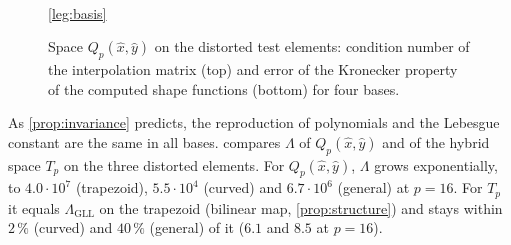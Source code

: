 \begin{figure}[t]
\\[1mm]
  \ref{leg:basis}
  \caption{Space $Q_p(\hat x,\hat y)$ on the distorted test elements: condition number of the
    interpolation matrix (top) and error of the Kronecker property of the computed shape
    functions (bottom) for four bases.}
  \label{fig:basis}
\end{figure}

\begin{table}[t]
  \centering\small
  \caption{Parallelogram (affine element), $Q_p(\hat x,\hat y)$: asymmetry
    $\|\bm K^e-\bm K^{e\T}\|_F/\|\bm K^e\|_F$ of the element matrix (zero in exact arithmetic) and
    condition number of $\bm V$.}
  \label{tab:affine}
  
\end{table}

As \cref{prop:invariance} predicts, the reproduction of polynomials and the Lebesgue constant
are the same in all bases.  compares $\Lambda$ of $Q_p(\hat x,\hat y)$ and of
the hybrid space $T_p$ on the three distorted elements. For $Q_p(\hat x,\hat y)$, $\Lambda$ grows
exponentially, to $4.0\cdot10^7$ (trapezoid), $5.5\cdot10^4$ (curved) and $6.7\cdot10^6$ (general) at
$p=16$. For $T_p$ it equals $\Lambda_{\mathrm{GLL}}$ on the trapezoid (bilinear map,
\cref{prop:structure}) and stays within $2\,\%$ (curved) and $40\,\%$ (general) of it ($6.1$ and
$8.5$ at $p=16$).

